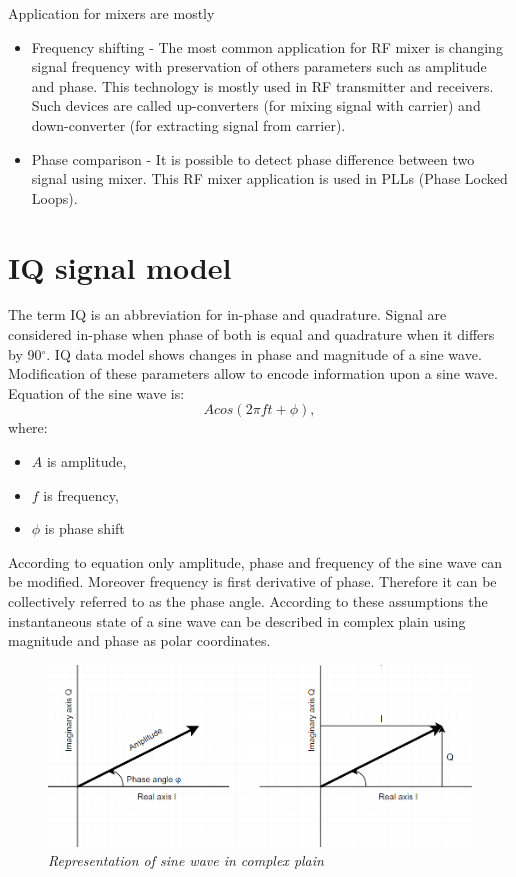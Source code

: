 \documentclass[en,printmode]{mgr}
\begin{document}
		Application for mixers are mostly \cite{mix}
		\begin{itemize}
			\item Frequency shifting - The most common application for RF mixer is changing signal frequency
			with preservation of others parameters such as amplitude and phase.
			This technology is mostly used in RF transmitter and receivers.
			Such devices are called up-converters (for mixing signal with carrier) and down-converter (for
			extracting signal from carrier).
			\item Phase comparison - It is possible to detect phase difference between two signal using mixer.
			This RF mixer application is used in PLLs (Phase Locked Loops).
		\end{itemize}
	
	\section{IQ signal model}
			The term IQ is an abbreviation for in-phase and quadrature. Signal are considered in-phase when phase
		of both is equal and quadrature when it differs by 90$^{\circ}$. IQ data model shows changes in phase and
		magnitude of a sine wave. Modification of these parameters allow to encode information upon a sine wave.
		\\
		
		\noindent				
		Equation of the sine wave is:
		\[
			A cos\left(2\pi f t+ \phi\right), \label{eq:sinewave}
		\]
		where:
		\begin{itemize}
			\item $A$ is amplitude,
			\item $f$ is frequency,
			\item $\phi$ is phase shift
		\end{itemize}
		
		According to equation \label{eq:sinewave} only amplitude, phase and frequency of the sine wave can be
		modified. Moreover frequency is first derivative of phase. Therefore it can be collectively referred to 
		as the phase angle. According to these assumptions the instantaneous state of a sine wave can be described
		in complex plain using magnitude and phase as polar coordinates.
		
		\begin{figure}[!htb]
    		\centering
   			\includegraphics[width=\textwidth]{plots/polarplots.png}
    		\caption{\textit{Representation of sine wave in complex plain}}
    		\label{fig:polarplot}
		\end{figure}
		
\end{document}
